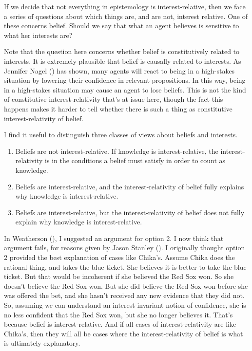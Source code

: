 \documentclass[
  11pt,
  letterpaper,
  DIV=11,
  numbers=noendperiod,
  twoside]{scrartcl}
\providecommand{\tightlist}{%
  \setlength{\itemsep}{0pt}\setlength{\parskip}{0pt}}
\begin{document}
If we decide that not everything in epistemology is interest-relative,
then we face a series of questions about which things are, and are not,
interest relative. One of these concerns belief. Should we say that what
an agent believes is sensitive to what her interests are?

Note that the question here concerns whether belief is constitutively
related to interests. It is extremely plausible that belief is causally
related to interests. As Jennifer Nagel ()
has shown, many agents will react to being in a high-stakes situation by
lowering their confidence in relevant propositions. In this way, being
in a high-stakes situation may cause an agent to lose beliefs. This is
not the kind of constitutive interest-relativity that's at issue here,
though the fact this happens makes it harder to tell whether there is
such a thing as constitutive interest-relativity of belief.

I find it useful to distinguish three classes of views about beliefs and
interests.

\begin{enumerate}
\def\labelenumi{\arabic{enumi}.}
\tightlist
\item
  Beliefs are not interest-relative. If knowledge is interest-relative,
  the interest-relativity is in the conditions a belief must satisfy in
  order to count as knowledge.
\item
  Beliefs are interest-relative, and the interest-relativity of belief
  fully explains why knowledge is interest-relative.
\item
  Beliefs are interest-relative, but the interest-relativity of belief
  does not fully explain why knowledge is interest-relative.
\end{enumerate}

In Weatherson (), I suggested an
argument for option 2. I now think that argument fails, for reasons
given by Jason Stanley (). I originally
thought option 2 provided the best explanation of cases like Chika's.
Assume Chika does the rational thing, and takes the blue ticket. She
believes it is better to take the blue ticket. But that would be
incoherent if she believed the Red Sox won. So she doesn't believe the
Red Sox won. But she did believe the Red Sox won before she was offered
the bet, and she hasn't received any new evidence that they did not. So,
assuming we can understand an interest-invariant notion of confidence,
she is no less confident that the Red Sox won, but she no longer
believes it. That's because belief is interest-relative. And if all
cases of interest-relativity are like Chika's, then they will all be
cases where the interest-relativity of belief is what is ultimately
explanatory.
\end{document}
